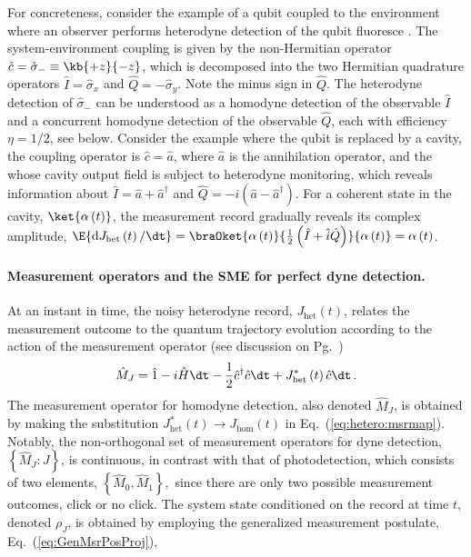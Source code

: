 For concreteness, consider the example of a qubit coupled to the environment
where an observer performs heterodyne detection of the qubit fluoresce
\citep{Campagne-Ibarcq2014,Campagne2016-Fluorescence,Naghiloo2016}.
The system-environment coupling is given by the non-Hermitian operator
$\hat{c}=\hat{\sigma}_{-}\equiv\kb{+z}{-z}$, which is decomposed
into the two Hermitian quadrature operators $\hat{I}=\hat{\sigma}_{x}$
and $\hat{Q}=-\hat{\sigma}_{y}$. Note the minus sign in $\hat{Q}$.
The heterodyne detection of $\hat{\sigma}_{-}$ can be understood
as a homodyne detection of the observable $\hat{I}$ and a concurrent
homodyne detection of the observable $\hat{Q}$, each with efficiency
$\eta=1/2$, see below. Consider the example where the qubit is replaced
by a cavity, the coupling operator is $\hat{c}=\hat{a}$, where $\hat{a}$
is the annihilation operator, and the whose cavity output field is
subject to heterodyne monitoring, which reveals information about
$\hat{I}=\hat{a}+\hat{a}^{\dagger}$ and $\hat{Q}=-i\left(\hat{a}-\hat{a}^{\dagger}\right)$.
For a coherent state in the cavity, $\ket{\alpha\left(t\right)}$,
the measurement record gradually reveals its complex amplitude, $\E{\mathrm{d}J_{\mathrm{het}}\left(t\right)/\dt}=\braOket{\alpha\left(t\right)}{\frac{1}{2}\left(\hat{I}+\hat{i}\hat{Q}\right)}{\alpha\left(t\right)}=\alpha\left(t\right)$. 

\paragraph{Measurement operators and the SME for perfect dyne detection.}

At an instant in time, the noisy heterodyne record, $J_{\mathrm{het}}\left(t\right)$,
relates the measurement outcome to the quantum trajectory evolution
according to the action of the measurement operator (see discussion
on Pg.~\pageref{eq:MrSpinBath})
\begin{equation}
\hat{M}_{J}=\hat{1}-i\hat{H}\dt-\frac{1}{2}\hat{c}^{\dagger}\hat{c}\dt+J_{\mathrm{het}}^{*}\left(t\right)\hat{c}\dt\,.\label{eq:hetero:msrmap}
\end{equation}
The measurement operator for homodyne detection, also denoted $\hat{M}_{J}$,
is obtained by making the substitution $J_{\mathrm{het}}^{*}\left(t\right)\rightarrow J_{\mathrm{hom}}\left(t\right)$
in Eq.~(\ref{eq:hetero:msrmap}). Notably, the non-orthogonal set
of measurement operators for dyne detection, $\left\{ \hat{M}_{J}:J\right\} $,
is continuous, in contrast with that of photodetection, which consists
of two elements, $\left\{ \hat{M}_{0},\hat{M}_{1}\right\} ,$ since
there are only two possible measurement outcomes, click or no click.
The system state conditioned on the record at time $t$, denoted $\rho_{J}$,
is obtained by employing the generalized measurement postulate, Eq.~(\ref{eq:GenMsrPosProj}),

